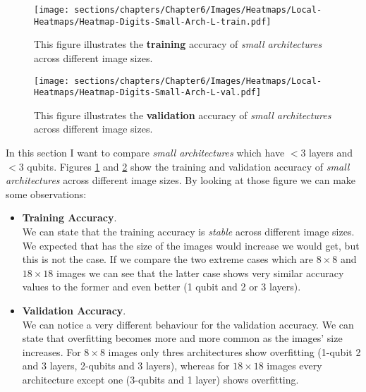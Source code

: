 \begin{figure}[h]
    \centering
    \texttt{[image: sections/chapters/Chapter6/Images/Heatmaps/Local-Heatmaps/Heatmap-Digits-Small-Arch-L-train.pdf]}
    \caption{This figure illustrates the \textbf{training} accuracy of \textit{small architectures} across different image sizes.}
    \label{fig:heatmap-Small-train}
\end{figure}

\begin{figure}[h]
    \centering
    \texttt{[image: sections/chapters/Chapter6/Images/Heatmaps/Local-Heatmaps/Heatmap-Digits-Small-Arch-L-val.pdf]}
    \caption{This figure illustrates the \textbf{validation} accuracy of \textit{small architectures} across different image sizes.}
    \label{fig:heatmap-Small-val}
\end{figure}


In this section I want to compare \textit{small architectures} which have $< 3$ layers and $< 3$ qubits.
Figures \ref{fig:heatmap-Small-train} and \ref{fig:heatmap-Small-val} show the training and validation 
accuracy of \textit{small architectures} across different image sizes.
By looking at those figure we can make some observations:

\begin{itemize}
    \item \textbf{Training Accuracy}.\\
    We can state that the training accuracy is \textit{stable} across different image sizes.
    We expected that has the size of the images would increase we would get, but this is not the case.
    If we compare the two extreme cases which are $8\times8$ and $18\times18$ images we can see that 
    the latter case shows very similar accuracy values to the former and even better (1 qubit and 2 or 3 layers).
    
    \item \textbf{Validation Accuracy}.\\
    We can notice a very different behaviour for the validation accuracy.
    We can state that overfitting becomes more and more common as the images' size increases.
    For $8\times8$ images only thres architectures show overfitting (1-qubit 2 and 3 layers, 2-qubits 
    and 3 layers), whereas for $18\times18$ images every architecture except one (3-qubits and 1 layer) 
    shows overfitting.
\end{itemize}
